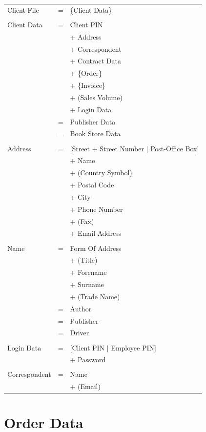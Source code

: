 \documentclass[11pt,a4paper,oneside,svgnames]{report}
\begin{document}
\begin{longtable}{p{3.5cm}p{0.5cm}p{8.5cm}}
Client File & = & \{Client Data\} \\
\\
Client Data & = & Client PIN\\
&  & + Address\\
&  & + Correspondent\\
&  & + Contract Data\\
&  & + \{Order\}\\
&  & + \{Invoice\}\\
&  & + (Sales Volume)\\
&  & + Login Data \\
& = & Publisher Data\\
& = & Book Store Data\\
\\
Address & = & [Street + Street Number $|$ Post-Office Box]\\
&  & + Name\\
&  & +  (Country Symbol)\\
&  & +  Postal Code\\
&  & + City\\
&  & + Phone Number\\
&  & + (Fax)\\
&  & + Email Address\\
\\
Name & = & Form Of Address\\
&  & + (Title)\\
&  & + Forename\\
&  & + Surname\\
&  & + (Trade Name)\\
& = & Author\\
& = & Publisher\\
& = & Driver\\
\\
Login Data & = & [Client PIN $|$ Employee PIN]\\
&  & + Password \\
\\
Correspondent & = & Name\\
&  & + (Email)\\
\end{longtable}


\section{Order Data}
\end{document}
